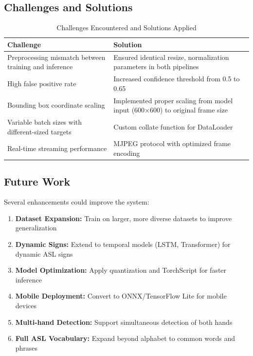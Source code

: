 \documentclass[12pt,a4paper]{article}
\begin{document}
\subsection{Challenges and Solutions}

\begin{table}[H]
    \centering
    \caption{Challenges Encountered and Solutions Applied}
    \label{tab:challenges}
    \begin{tabular}{|p{5cm}|p{7cm}|}
        \hline
        \textbf{Challenge} & \textbf{Solution} \\
        \hline
        Preprocessing mismatch between training and inference & Ensured identical resize, normalization parameters in both pipelines \\
        \hline
        High false positive rate & Increased confidence threshold from 0.5 to 0.65 \\
        \hline
        Bounding box coordinate scaling & Implemented proper scaling from model input (600×600) to original frame size \\
        \hline
        Variable batch sizes with different-sized targets & Custom collate function for DataLoader \\
        \hline
        Real-time streaming performance & MJPEG protocol with optimized frame encoding \\
        \hline
    \end{tabular}
\end{table}

\subsection{Future Work}

Several enhancements could improve the system:

\begin{enumerate}
    \item \textbf{Dataset Expansion:} Train on larger, more diverse datasets to improve generalization
    \item \textbf{Dynamic Signs:} Extend to temporal models (LSTM, Transformer) for dynamic ASL signs
    \item \textbf{Model Optimization:} Apply quantization and TorchScript for faster inference
    \item \textbf{Mobile Deployment:} Convert to ONNX/TensorFlow Lite for mobile devices
    \item \textbf{Multi-hand Detection:} Support simultaneous detection of both hands
    \item \textbf{Full ASL Vocabulary:} Expand beyond alphabet to common words and phrases
\end{enumerate}
\end{document}
